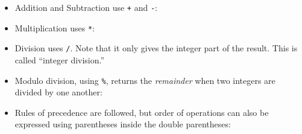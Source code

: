 \documentclass[]{krantz}
\makeatletter
\newenvironment{Shaded}{\begin{snugshade}}{\end{snugshade}}
\newcommand{\BuiltInTok}[1]{#1}
\newcommand{\ExtensionTok}[1]{#1}
\newcommand{\NormalTok}[1]{#1}
\newcommand{\VariableTok}[1]{\textcolor[rgb]{0,0,0}{#1}}
\newenvironment{kframe}{%
\medskip{}
\setlength{\fboxsep}{.8em}
 \def\at@end@of@kframe{}%
 \ifinner\ifhmode%
  \def\at@end@of@kframe{\end{minipage}}%
  \begin{minipage}{\columnwidth}%
 \fi\fi%
 \def\FrameCommand##1{\hskip\@totalleftmargin \hskip-\fboxsep
 \colorbox{shadecolor}{##1}\hskip-\fboxsep
     \hskip-\linewidth \hskip-\@totalleftmargin \hskip\columnwidth}%
 \MakeFramed {\advance\hsize-\width
   \@totalleftmargin\z@ \linewidth\hsize
   \@setminipage}}%
 {\par\unskip\endMakeFramed%
 \at@end@of@kframe}
\renewenvironment{Shaded}{\begin{kframe}}{\end{kframe}}
\makeatother
\begin{document}
\begin{itemize}
\item
  Addition and Subtraction use \texttt{+} and \texttt{-}:

\begin{Shaded}
\end{Shaded}
\item
  Multiplication uses \texttt{*}:

\begin{Shaded}
\end{Shaded}
\item
  Division uses \texttt{/}. Note that it only gives the integer part of the result. This
  is called ``integer division.''

\begin{Shaded}
\end{Shaded}
\item
  Modulo division, using \texttt{\%}, returns the \emph{remainder} when two integers are divided by one another:

\begin{Shaded}
\end{Shaded}
\item
  Rules of precedence are followed, but order of operations can also be expressed
  using parentheses inside the double parentheses:


\end{itemize}
\end{document}
